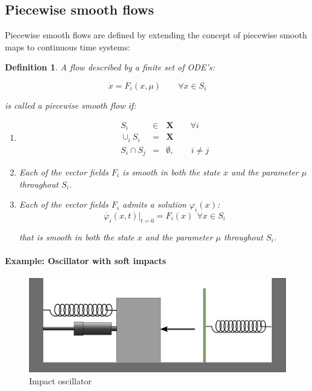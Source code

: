 \documentclass{book}
\renewcommand{\(}{\begin{columns}}
\renewcommand{\)}{\end{columns}}
\newcommand{\<}[1]{\begin{column}{#1}}
\renewcommand{\>}{\end{column}}
\newcommand{\para}{\paragraph}
\newtheorem{definition}{Definition}[section]
\begin{document}
\subsection{Piecewise smooth flows}
Piecewise smooth flows are defined by extending the concept of piecewise smooth maps to 
continuous time systems:
\begin{definition}
A flow  described by a \emph{finite} set of ODE's:

\begin{equation}
\label{eq-pwflow}
\dot{x}=F_i(x,\mu)\hspace{2em}  \forall x\in S_i
\end{equation}

is called a piecewise smooth flow if:

\begin{enumerate}
\item 
\begin{eqnarray*}
S_i&\in& \mathbf{X}\hspace{2em} \forall i\\
\cup_i S_i&=&\mathbf{X}\\
S_i\cap S_j&=&\emptyset, \hspace{2em} i\ne j
\end{eqnarray*}

\item Each of the vector fields $F_i$ is smooth in both the state $x$ and the parameter 
$\mu$ throughout $S_i$.  

\item Each of the vector fields $F_i$  admits a solution $\varphi_i(x)$:
\begin{equation}
\label{eq-def_phi}
\dot{\varphi_i}(x,t)|_{t=0}=F_i(x)~~\forall x\in S_i
\end{equation}

that is smooth in both the state $x$ and the parameter 
$\mu$ throughout $S_i$.  
\end{enumerate}
\end{definition}

\para{Example: Oscillator with soft impacts\\}
\begin{figure}[!hbp]
\caption{Impact oscillator}
\begin{center}
\includegraphics[width=0.5\columnwidth]{osc-pw}
\end{center}
\end{figure}
\end{document}
